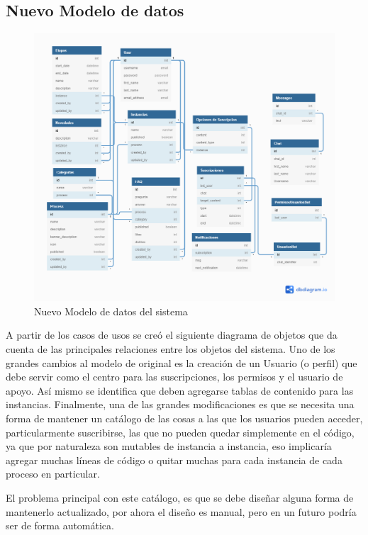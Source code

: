     \subsection{Nuevo Modelo de datos}
        \begin{figure}[h]
            \centering
            \includegraphics[width=\textwidth]{media/diagramas/modelo_de_datos/memoria.png}
            \caption[Nuevo modelo de datos]{Nuevo Modelo de datos del sistema}
        \end{figure}
        \par A partir de los casos de usos se creó el siguiente diagrama de objetos que da cuenta de las principales relaciones entre los objetos del sistema. Uno de los grandes cambios al modelo de original es la creación de un Usuario (o perfil) que debe servir como el centro para las suscripciones, los permisos y el usuario de apoyo. Así mismo se identifica que deben agregarse tablas de contenido para las instancias. Finalmente, una de las grandes modificaciones es que se necesita una forma de mantener un catálogo de las cosas a las que los usuarios pueden acceder, particularmente suscribirse, las que no pueden quedar simplemente en el código, ya que por naturaleza son mutables de instancia a instancia, eso implicaría agregar muchas líneas de código o quitar muchas para cada instancia de cada proceso en particular.
        \par El problema principal con este catálogo, es que se debe diseñar alguna forma de mantenerlo actualizado, por ahora el diseño es manual, pero en un futuro podría ser de forma automática.

